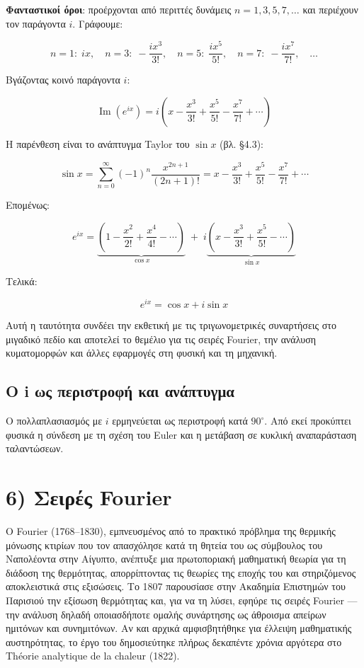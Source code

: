 \documentclass[a4paper, 11pt]{article}
\begin{document}
\textbf{Φανταστικοί όροι}: προέρχονται από περιττές δυνάμεις
\(n = 1,3,5,7,\dots\) και περιέχουν τον παράγοντα \(i\). Γράφουμε:

\[
n=1:\; i x,\quad n=3:\; -\frac{i x^3}{3!},\quad n=5:\; \frac{i x^5}{5!},\quad n=7:\; -\frac{i x^7}{7!},\quad \dots
\]

Βγάζοντας κοινό παράγοντα \(i\):

\[
\operatorname{Im}(e^{ix}) = i\left( x - \frac{x^3}{3!} + \frac{x^5}{5!} - \frac{x^7}{7!} + \cdots \right)
\]

Η παρένθεση είναι το ανάπτυγμα Taylor του \(\sin x\) (βλ. §4.3):

\[
\sin x = \sum_{n=0}^{\infty} (-1)^n \frac{x^{2n+1}}{(2n+1)!} = x - \frac{x^3}{3!} + \frac{x^5}{5!} - \frac{x^7}{7!} + \cdots
\]

Επομένως:

\[
e^{ix} = \underbrace{\left(1 - \frac{x^2}{2!} + \frac{x^4}{4!} - \cdots \right)}_{\cos x} \;+\; i\underbrace{\left(x - \frac{x^3}{3!} + \frac{x^5}{5!} - \cdots \right)}_{\sin x}
\]

Τελικά:

\[
\boxed{e^{ix} = \cos x + i\sin x}
\]

Αυτή η ταυτότητα συνδέει την εκθετική με τις τριγωνομετρικές συναρτήσεις
στο μιγαδικό πεδίο και αποτελεί το θεμέλιο για τις σειρές Fourier, την
ανάλυση κυματομορφών και άλλες εφαρμογές στη φυσική και τη μηχανική.

\subsection{Ο i ως περιστροφή και
ανάπτυγμα}\label{ux3bf-i-ux3c9ux3c2-ux3c0ux3b5ux3c1ux3b9ux3c3ux3c4ux3c1ux3bfux3c6ux3ae-ux3baux3b1ux3b9-ux3b1ux3bdux3acux3c0ux3c4ux3c5ux3b3ux3bcux3b1}

Ο πολλαπλασιασμός με \(i\) ερμηνεύεται ως περιστροφή κατά \(90^\circ\).
Από εκεί προκύπτει φυσικά η σύνδεση με τη σχέση του Euler και η μετάβαση
σε κυκλική αναπαράσταση ταλαντώσεων.

\section{6) Σειρές
Fourier}\label{ux3c3ux3b5ux3b9ux3c1ux3adux3c2-fourier}

Ο Fourier (1768--1830), εμπνευσμένος από το πρακτικό πρόβλημα της
θερμικής μόνωσης κτιρίων που τον απασχόλησε κατά τη θητεία του ως
σύμβουλος του Ναπολέοντα στην Αίγυπτο, ανέπτυξε μια πρωτοποριακή
μαθηματική θεωρία για τη διάδοση της θερμότητας, απορρίπτοντας τις
θεωρίες της εποχής του και στηριζόμενος αποκλειστικά στις εξισώσεις. Το
1807 παρουσίασε στην Ακαδημία Επιστημών του Παρισιού την εξίσωση
θερμότητας και, για να τη λύσει, εφηύρε τις σειρές Fourier --- την
ανάλυση δηλαδή οποιασδήποτε ομαλής συνάρτησης ως άθροισμα απείρων
ημιτόνων και συνημιτόνων. Αν και αρχικά αμφισβητήθηκε για έλλειψη
μαθηματικής αυστηρότητας, το έργο του δημοσιεύτηκε πλήρως δεκαπέντε
χρόνια αργότερα στο Théorie analytique de la chaleur (1822).
\end{document}
